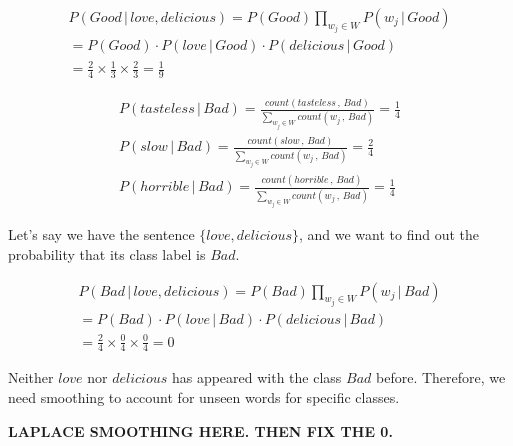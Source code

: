 \documentclass[9pt,twocolumn]{article}
\begin{document}
\begin{equation}
\begin{split}
P(Good\,|\,{love, delicious}) = P(Good)\prod_{w_j\in W}P(w_j\,|\,Good)\\
= P(Good)\cdot P(love\,|\,Good)\cdot P(delicious\,|\,Good)\\
= \frac{2}{4}\times\frac{1}{3}\times\frac{2}{3} = \frac{1}{9}
\end{split}
\end{equation}

\begin{equation}
\begin{split}
P(tasteless\,|\,Bad) = \frac{count(tasteless\,,\,Bad)}{\sum_{w_j\in W}count(w_j\,,\,Bad)} = \frac{1}{4}\\
P(slow\,|\,Bad) = \frac{count(slow\,,\,Bad)}{\sum_{w_j\in W}count(w_j\,,\,Bad)} = \frac{2}{4}\\
P(horrible\,|\,Bad) = \frac{count(horrible\,,\,Bad)}{\sum_{w_j\in W}count(w_j\,,\,Bad)} = \frac{1}{4}
\end{split}
\end{equation}

Let's say we have the sentence $\{love, delicious\}$, and we want to find out the probability that its class label is $Bad$.

\begin{equation}
\begin{split}
P(Bad\,|\,{love, delicious}) = P(Bad)\prod_{w_j\in W}P(w_j\,|\,Bad)\\
= P(Bad)\cdot P(love\,|\,Bad)\cdot P(delicious\,|\,Bad)\\
= \frac{2}{4}\times\frac{0}{4}\times\frac{0}{4} = 0
\end{split}
\end{equation}

Neither $love$ nor $delicious$ has appeared with the class $Bad$ before. Therefore, we need smoothing to account for unseen words for specific classes.

\textbf{LAPLACE SMOOTHING HERE. THEN FIX THE 0.}

\end{document}
